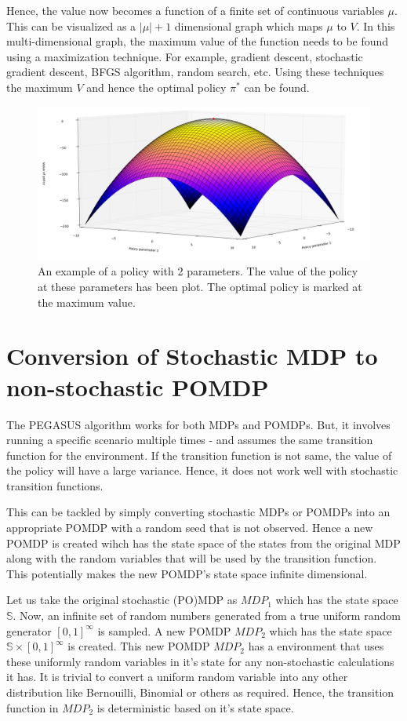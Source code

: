 \documentclass[hidelinks,BTech]{iitmdiss}
\begin{document}
Hence, the value now becomes a function of a finite set of continuous variables $\mu$. This can be visualized as a $|\mu|+1$ dimensional graph which maps $\mu$ to $V$. In this multi-dimensional graph, the maximum value of the function needs to be found using a maximization technique. For example, gradient descent, stochastic gradient descent, BFGS algorithm, random search, etc. Using these techniques the maximum $V$ and hence the optimal policy $\pi^{*}$ can be found.

\begin{figure}[H]
  \centering
    \includegraphics[width=\textwidth]{gradient_descent.png}
    \caption{An example of a policy with 2 parameters. The value of the policy at these parameters has been plot. The optimal policy is marked at the maximum value.}
\end{figure}

\section{Conversion of Stochastic MDP to non-stochastic POMDP}

The PEGASUS algorithm works for both MDPs and POMDPs. But, it involves running a specific scenario multiple times - and assumes the same transition function for the environment. If the transition function is not same, the value of the policy will have a large variance. Hence, it does not work well with stochastic transition functions.

This can be tackled by simply converting stochastic MDPs or POMDPs into an appropriate POMDP with a random seed that is not observed. Hence a new POMDP is created wihch has the state space of the states from the original MDP along with the random variables that will be used by the transition function. This potentially makes the new POMDP's state space infinite dimensional.

Let us take the original stochastic (PO)MDP as $MDP_{1}$ which has the state space $\mathbb{S}$. Now, an infinite set of random numbers generated from a true uniform random generator $[0,1]^{\infty}$ is sampled. A new POMDP $MDP_{2}$ which has the state space $\mathbb{S} \times [0,1]^{\infty}$ is created. This new POMDP $MDP_{2}$ has a environment that uses these uniformly random variables in it's state for any non-stochastic calculations it has. It is trivial to convert a uniform random variable into any other distribution like Bernouilli, Binomial or others as required. Hence, the transition function in $MDP_{2}$ is deterministic based on it's state space.
\end{document}
